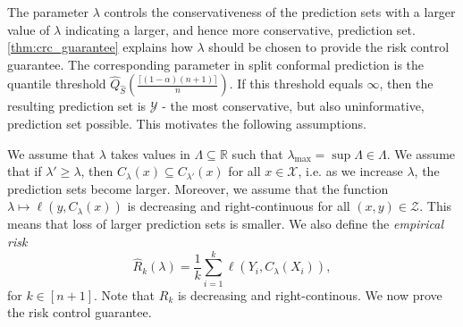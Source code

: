 \documentclass[11pt, titlepage]{article} %
\newcommand{\R}{\mathrm}
\numberwithin{equation}{section}
\theoremstyle{definition}
\numberwithin{theorem}{section}
\numberwithin{lemma}{section}
\numberwithin{corollary}{section}
\numberwithin{proposition}{section}
\numberwithin{definition}{section}
\numberwithin{remark}{section}
\begin{document}
\noindent
The parameter \(\lambda\) controls the conservativeness of the prediction sets with a larger value of \(\lambda\) indicating a larger, and hence more conservative, prediction set. \cref{thm:crc_guarantee} explains how \(\lambda\) should be chosen to provide the risk control guarantee. The corresponding parameter in split conformal prediction is the quantile threshold \(\hat{Q}_{\hat{S}}\left( \frac{\lceil (1-\alpha)(n+1) \rceil}{n} \right)\). If this threshold equals \(\infty\), then the resulting prediction set is \(\mathcal{Y}\) - the most conservative, but also uninformative, prediction set possible. This motivates the following assumptions. \vskip5pt

\noindent
We assume that \(\lambda\) takes values in \(\Lambda \subseteq \mathbb{R}\) such that \( \lambda_{\R{max}} = \sup \Lambda \in \Lambda\). We assume that if \(\lambda' \geq \lambda\), then \(C_\lambda (x) \subseteq C_{\lambda'}(x)\) for all \(x \in \mathcal{X}\), i.e. as we increase \(\lambda\), the prediction sets become larger. Moreover, we assume that the function \(\lambda \mapsto \ell(y, C_\lambda(x))\) is decreasing and right-continuous for all \((x,y) \in \mathcal{Z}\). This means that loss of larger prediction sets is smaller. We also define the \textit{empirical risk} \[\hat{R}_k(\lambda) = \frac{1}{k} \sum_{i=1}^k \ell(Y_i, C_\lambda (X_i)),\] for \(k \in [n+1]\). Note that \(R_k\) is decreasing and right-continous. We now prove the risk control guarantee.
\end{document}
